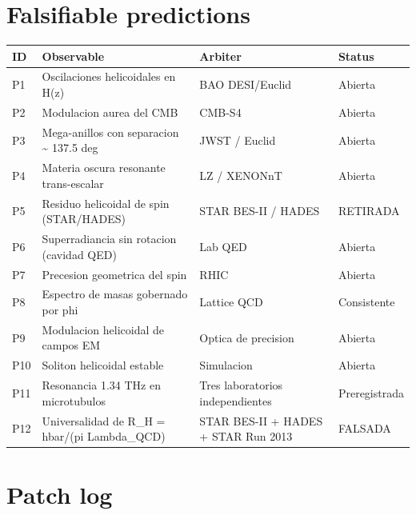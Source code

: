 ﻿\documentclass[11pt,letterpaper]{article}
\begin{document}
\newpage
\section*{Falsifiable predictions}

\begin{longtable}{@{}p{0.8cm}p{5.5cm}p{3.5cm}p{2.5cm}@{}}
\toprule
\textbf{ID} & \textbf{Observable} & \textbf{Arbiter} & \textbf{Status} \\
\midrule
\endhead
P1 & Oscilaciones helicoidales en H(z) & BAO DESI/Euclid & Abierta \\
P2 & Modulacion aurea del CMB & CMB-S4 & Abierta \\
P3 & Mega-anillos con separacion \textasciitilde{} 137.5 deg & JWST / Euclid & Abierta \\
P4 & Materia oscura resonante trans-escalar & LZ / XENONnT & Abierta \\
P5 & Residuo helicoidal de spin (STAR/HADES) & STAR BES-II / HADES & RETIRADA \\
P6 & Superradiancia sin rotacion (cavidad QED) & Lab QED & Abierta \\
P7 & Precesion geometrica del spin & RHIC & Abierta \\
P8 & Espectro de masas gobernado por phi & Lattice QCD & Consistente \\
P9 & Modulacion helicoidal de campos EM & Optica de precision & Abierta \\
P10 & Soliton helicoidal estable & Simulacion & Abierta \\
P11 & Resonancia 1.34 THz en microtubulos & Tres laboratorios independientes & Preregistrada \\
P12 & Universalidad de R\_H = hbar/(pi Lambda\_QCD) & STAR BES-II + HADES + STAR Run 2013 & FALSADA \\
\bottomrule
\end{longtable}

\newpage
\section{Patch log}
\end{document}
